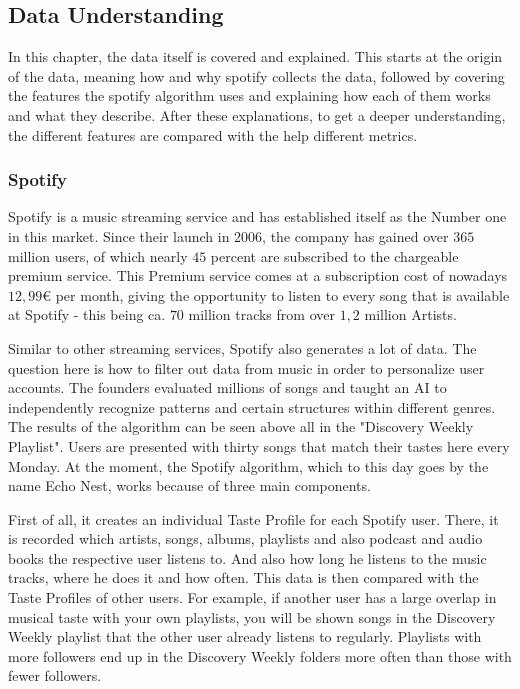 \subsection{Data Understanding}
In this chapter, the data itself is covered and explained. 
This starts at the origin of the data, meaning how and why spotify collects the data, 
followed by covering the features the spotify algorithm uses and explaining how each of them works and what they describe.
After these explanations, to get a deeper understanding, the different features are compared with the help different metrics.

\subsubsection{Spotify}
Spotify is a music streaming service and has established itself as the Number one in this market. 
Since their launch in 2006, the company has gained over \(365\) million users, of which nearly \(45\) percent
are subscribed to the chargeable premium service. 
This Premium service comes at a subscription cost of nowadays \(12,99\)€ per month,
giving the opportunity to listen to every song that is available at Spotify - this being
ca. \(70\) million tracks from over \(1,2\) million Artists. \cite[]{L.Rabe2021}

Similar to other streaming services, Spotify also generates a lot of data.
The question here is how to filter out data from music in order to personalize user accounts. 
The founders evaluated millions of songs and taught an AI to independently recognize
patterns and certain structures within different genres. 
The results of the algorithm can be seen above all in the "Discovery Weekly Playlist". 
Users are presented with thirty songs that match their tastes here every Monday.
At the moment, the Spotify algorithm, which to this day goes by the name Echo Nest,
works because of three main components. \cite[]{Stephenson2021}

First of all, it creates an individual Taste Profile for each Spotify user. 
There, it is recorded which artists, songs, albums, playlists and also podcast and audio books the
respective user listens to. 
And also how long he listens to the music tracks, where he does it and how often.
This data is then compared with the Taste Profiles of other users. 
For example, if another user has a large overlap in musical taste with your own playlists,
you will be shown songs in the Discovery Weekly playlist that the other user already listens to regularly.
Playlists with more followers end up in the Discovery Weekly folders more often than those with
fewer followers. \cite[]{Stephenson2021}

